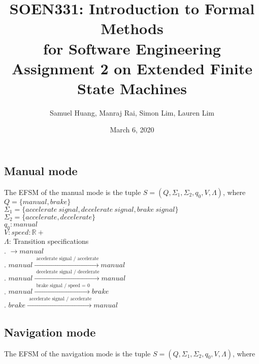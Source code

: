 \documentclass[12pt]{article}
\title{SOEN331: Introduction to Formal Methods\\for Software Engineering\\
Assignment 2 on Extended Finite State Machines}
\author{Samuel Huang, Manraj Rai, Simon Lim, Lauren Lim}
\date{March 6, 2020}
\begin{document}
\begin{spacing}{1.5}

\maketitle

\subsection{Manual mode}

\noindent The EFSM of the manual mode is the tuple $S = (Q, \Sigma_1, \Sigma_2, q_0, V, \Lambda)$, where\\

\noindent $Q = \{manual, brake\}$\\
\noindent $\Sigma_1 = \{accelerate~signal, decelerate~signal, brake~signal\}$\\
\noindent $\Sigma_2 = \{accelerate, decelerate\}$\\
\noindent $q_0: manual$\\
\noindent $V: speed: \mathbb{R+} $\\
\noindent $\Lambda$: Transition specifications\\
. $\rightarrow manual$\\
. $manual \xrightarrow {\text { accelerate signal / accelerate}} manual$\\
. $manual \xrightarrow {\text { decelerate signal / decelerate}} manual$\\
. $manual \xrightarrow {\text { brake signal / speed = 0}} brake$\\
. $brake \xrightarrow {\text { accelerate signal / accelerate}} manual$\\

\subsection{Navigation mode}

\noindent The EFSM of the navigation mode is the tuple $S = (Q, \Sigma_1, \Sigma_2, q_0, V, \Lambda)$, where\\


\end{spacing}
\end{document}
